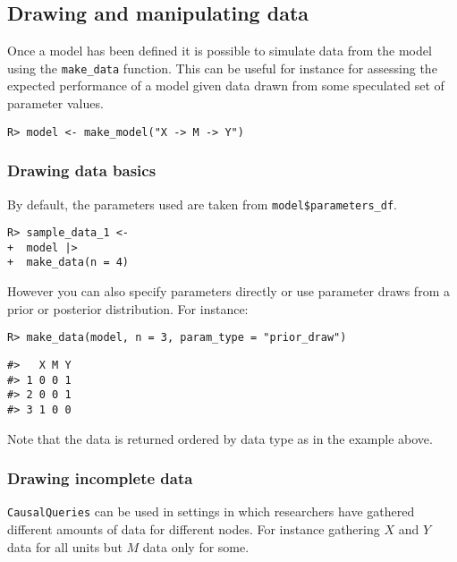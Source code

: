 \documentclass[
  11pt,
  article]{jss}
\begin{document}
\hypertarget{drawing-and-manipulating-data}{%
\subsection{Drawing and manipulating
data}\label{drawing-and-manipulating-data}}

Once a model has been defined it is possible to simulate data from the
model using the \texttt{make\_data} function. This can be useful for
instance for assessing the expected performance of a model given data
drawn from some speculated set of parameter values.

\begin{verbatim}
R> model <- make_model("X -> M -> Y") 
\end{verbatim}

\hypertarget{drawing-data-basics}{%
\subsubsection{Drawing data basics}\label{drawing-data-basics}}

By default, the parameters used are taken from
\texttt{model\$parameters\_df}.

\begin{verbatim}
R> sample_data_1 <- 
+  model |> 
+  make_data(n = 4)
\end{verbatim}

However you can also specify parameters directly or use parameter draws
from a prior or posterior distribution. For instance:

\begin{verbatim}
R> make_data(model, n = 3, param_type = "prior_draw")
\end{verbatim}

\begin{verbatim}
#>   X M Y
#> 1 0 0 1
#> 2 0 0 1
#> 3 1 0 0
\end{verbatim}

Note that the data is returned ordered by data type as in the example
above.

\hypertarget{drawing-incomplete-data}{%
\subsubsection{Drawing incomplete data}\label{drawing-incomplete-data}}

\texttt{CausalQueries} can be used in settings in which researchers have
gathered different amounts of data for different nodes. For instance
gathering \(X\) and \(Y\) data for all units but \(M\) data only for
some.
\end{document}

